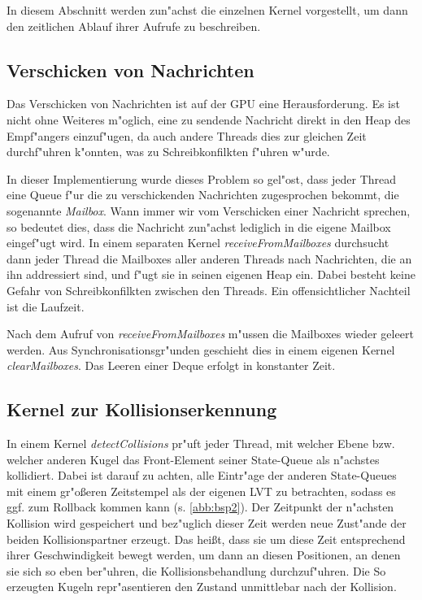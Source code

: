 \documentclass[a4paper, 10pt, openright, parskip, chapterprefix]{scrreprt}
\begin{document}
In diesem Abschnitt werden zun"achst die einzelnen Kernel vorgestellt, um dann den zeitlichen Ablauf ihrer Aufrufe
zu beschreiben.

\subsection{Verschicken von Nachrichten}
\label{subsec:VerschickenVonNachrichten}
Das Verschicken von Nachrichten ist auf der GPU eine Herausforderung. Es ist nicht ohne Weiteres m"oglich, eine zu sendende
Nachricht direkt in den Heap des Empf"angers einzuf"ugen, da auch andere Threads dies zur gleichen Zeit durchf"uhren
k"onnten, was zu Schreibkonfilkten f"uhren w"urde.

In dieser Implementierung wurde dieses Problem so gel"ost, dass jeder Thread eine Queue f"ur die zu verschickenden
Nachrichten zugesprochen bekommt, die sogenannte \emph{Mailbox}. Wann immer wir vom Verschicken einer Nachricht
sprechen, so bedeutet dies, dass die Nachricht zun"achst lediglich in die eigene Mailbox eingef"ugt wird.
In einem separaten
Kernel \emph{receiveFromMailboxes} durchsucht dann jeder Thread die Mailboxes aller anderen Threads nach
Nachrichten, die an ihn addressiert sind,
und f"ugt sie in seinen eigenen Heap ein. Dabei besteht keine Gefahr von Schreibkonfilkten zwischen den Threads.
Ein offensichtlicher Nachteil ist die Laufzeit.

Nach dem Aufruf von \emph{receiveFromMailboxes} m"ussen die Mailboxes wieder geleert werden. Aus
Synchronisationsgr"unden geschieht dies in einem eigenen Kernel \emph{clearMailboxes}. Das Leeren einer Deque
erfolgt in konstanter Zeit.


\subsection{Kernel zur Kollisionserkennung}
\label{subsec:KernelZurKollisionserkennung}
In einem Kernel \emph{detectCollisions} pr"uft jeder Thread, mit welcher Ebene
bzw. welcher anderen Kugel das Front-Element seiner State-Queue als n"achstes kollidiert. Dabei ist
darauf zu achten, alle Eintr"age der anderen State-Queues mit einem
gr"o\ss eren Zeitstempel als der eigenen LVT zu betrachten, sodass es ggf. zum Rollback kommen kann (s. \ref{abb:bsp2}). Der Zeitpunkt der n"achsten
Kollision wird gespeichert und bez"uglich dieser Zeit werden neue Zust"ande der beiden Kollisionspartner erzeugt. Das
hei\ss t, dass sie um diese Zeit entsprechend ihrer Geschwindigkeit bewegt werden, um dann an diesen Positionen, an
denen sie sich so eben ber"uhren, die Kollisionsbehandlung
durchzuf"uhren. Die So erzeugten Kugeln repr"asentieren den Zustand unmittlebar nach der Kollision.
\end{document}
